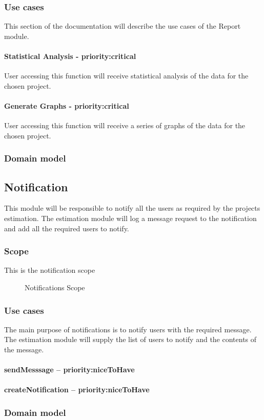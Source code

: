 \subsubsection{Use cases}
	This section of the documentation will describe the use cases of the Report module.
	\paragraph{Statistical Analysis - priority:critical}
	User accessing this function will receive statistical analysis of the data for the chosen project.

	\paragraph{Generate Graphs - priority:critical}
	User accessing this function will receive a series of graphs of the data for the chosen project. 
\subsubsection{Domain model}

\subsection{Notification}
This module will be responsible to notify all the users as required by the projects estimation. The estimation module will log a message request to the notification and add all the required users to notify.
\subsubsection{Scope}
This is the notification scope
	\begin{figure}[H]
	    	\centering
	    	\caption{Notifications Scope}
	    	\label{fig:Notification_Scope}
   	\end{figure}
\subsubsection{Use cases}
The main purpose of notifications is to notify users with the required message. The estimation module will supply the list of users to notify and the contents of the message.
\paragraph{sendMesssage -- priority:niceToHave}
\paragraph{createNotification -- priority:niceToHave}
\subsubsection{Domain model}
